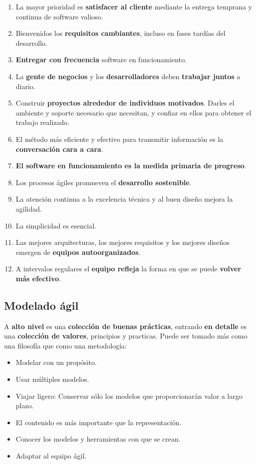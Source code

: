 \begin{enumerate}
    \item La mayor prioridad es \textbf{satisfacer al cliente} mediante la entrega temprana y continua de software valioso.
    \item Bienvenidos los \textbf{requisitos cambiantes}, incluso en fases tardías del desarrollo.
    \item \textbf{Entregar con frecuencia} software en funcionamiento.
    \item La \textbf{gente de negocios} y los \textbf{desarrolladores} deben \textbf{trabajar juntos} a diario. %
    \item Construir \textbf{proyectos alrededor de individuos motivados}. Darles el ambiente y soporte necesario que necesitan, y confiar en ellos para obtener el trabajo realizado. %
    \item El método más eficiente y efectivo para transmitir información es la \textbf{conversación cara a cara}.
    \item \textbf{El software en funcionamiento es la medida primaria de progreso}.
    \item Los procesos ágiles promueven el \textbf{desarrollo sostenible}. %
    \item La atención continua a la excelencia técnica y al buen diseño mejora la agilidad.
    \item La simplicidad es esencial. %
    \item Las mejores arquitecturas, los mejores requisitos y los mejores diseños emergen de \textbf{equipos autoorganizados}.
    \item A intervalos regulares el \textbf{equipo refleja} la forma en que se puede \textbf{volver más efectivo}.
\end{enumerate}

\subsection{Modelado ágil}
A \textbf{alto nivel} es una \textbf{colección de buenas prácticas}, entrando \textbf{en detalle} es una \textbf{colección de valores}, principios y practicas. Puede ser tomado más como una filosofía que como una metodología: 
\begin{itemize}
   \item Modelar con un propósito.
   \item Usar múltiples modelos.
   \item Viajar ligero: Conservar sólo los modelos que proporcionarán valor a largo plazo.
   \item El contenido es más importante que la representación.
   \item Conocer los modelos y herramientas con que se crean.
   \item Adaptar al equipo ágil.
\end{itemize}

